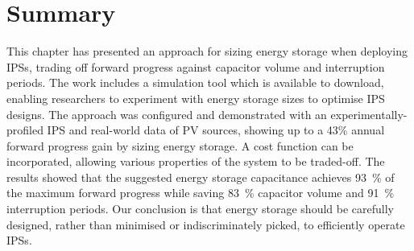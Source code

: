 \section{Summary} \label{sec:c4_summary}

This chapter has presented an approach for sizing energy storage when deploying IPSs, trading off forward progress against capacitor volume and interruption periods. 
The work includes a simulation tool which is available to download, enabling researchers to experiment with energy storage sizes to optimise IPS designs. 
The approach was configured and demonstrated with an experimentally-profiled IPS and real-world data of PV sources, showing up to a 43\% annual forward progress gain by sizing energy storage. 
A cost function can be incorporated, allowing various properties of the system to be traded-off. 
The results showed that the suggested energy storage capacitance achieves \SI{93}{\percent} of the maximum forward progress while saving \SI{83}{\percent} capacitor volume and \SI{91}{\percent} interruption periods. 
Our conclusion is that energy storage should be carefully designed, rather than minimised or indiscriminately picked, to efficiently operate IPSs. 
